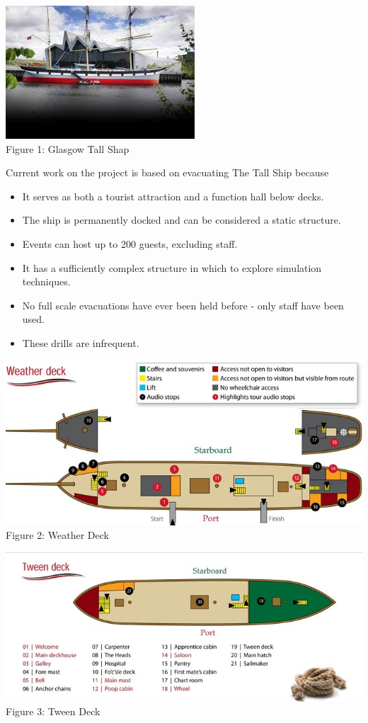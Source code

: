 \documentclass[a4paper,10pt]{article}
\begin{document}
\begin{center}
\includegraphics{glasgowTallShip.jpg}
\\Figure 1: Glasgow Tall Shap
\end{center}
Current work on the project is based on evacuating The Tall Ship because 
\begin{itemize}
 \item It serves as both a tourist attraction and a function hall below decks.
 \item The ship is permanently docked and can be considered a static structure.
 \item Events can host up to 200 guests, excluding staff.
 \item It has a sufficiently complex structure in which to explore simulation techniques.
 \item No full scale evacuations have ever been held before - only staff have been used.
 \item These drills are infrequent.
\end{itemize}

\begin{center}
\includegraphics[scale=0.4]{weatherdeck.jpg}
\\Figure 2: Weather Deck
\end{center}

\begin{center}
\includegraphics[scale=0.4]{tweendeck.jpg}
\\Figure 3: Tween Deck
\end{center}
\end{document}
